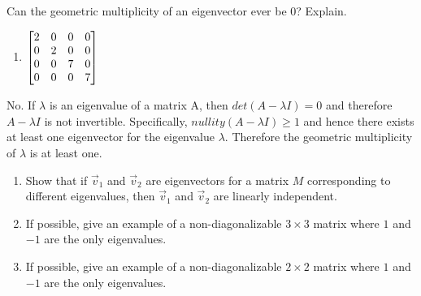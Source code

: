 \begin{exercises}
\begin{problist}
		\prob Can the geometric multiplicity of an eigenvector ever be $0$? Explain.
		\begin{solution}
    		\begin{enumerate}
        		\item $\mat{2&0&0&0\\0&2&0&0\\0&0&7&0\\0&0&0&7}$
    		\end{enumerate}
		\end{solution}
		\begin{solution}
		    No. If $\lambda$ is an eigenvalue of a matrix A, then $det(A - \lambda I)=0$ and therefore $A - \lambda I$ is not invertible. Specifically, $nullity(A - \lambda I) \geq 1$ and hence there exists at least one eigenvector for the eigenvalue $\lambda$. Therefore the geometric multiplicity of $\lambda$ is at least one.
		\end{solution}
		\prob \begin{enumerate}
			\item Show that if $\vec v_1$ and $\vec v_2$ are eigenvectors
				for a matrix $M$ corresponding to different eigenvalues,
				then $\vec v_1$ and $\vec v_2$ are linearly independent.
			\item If possible, give an example of a non-diagonalizable $3\times 3$
				matrix where $1$ and $-1$ are the only eigenvalues.
			\item If possible, give an example of a non-diagonalizable $2\times 2$
				matrix where $1$ and $-1$ are the only eigenvalues.
		\end{enumerate}
	\end{problist}
\end{exercises}
